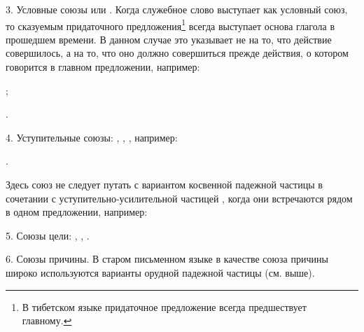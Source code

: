 3. Условные союзы  или . Когда служебное слово  выступает как условный союз, то сказуемым придаточного предложения\footnote[50]{В тибетском языке придаточное предложение всегда предшествует главному.} всегда выступает основа глагола в прошедшем времени. В данном случае это указывает не на то, что действие совершилось, а на то, что оно должно совершиться прежде действия, о котором говорится в главном предложении, например:
\begin{prfsample}
	\item {};
	\item {}.
\end{prfsample}

4. Уступительные союзы: , , , например:
\begin{prfsample}
	\item {}.
\end{prfsample}
Здесь союз  не следует путать с вариантом косвенной падежной частицы  в сочетании с уступительно-усилительной частицей , когда они встречаются рядом в одном предложении, например:
\begin{prfsample}
	\item {}
\end{prfsample}

5. Союзы цели: , , .

6. Союзы причины. В старом письменном языке в качестве союза причины широко используются варианты орудной падежной частицы (см. выше).

